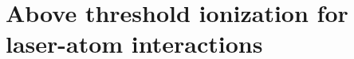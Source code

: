 \section{Above threshold ionization for laser-atom interactions}
\label{ch:ati_results}


























































